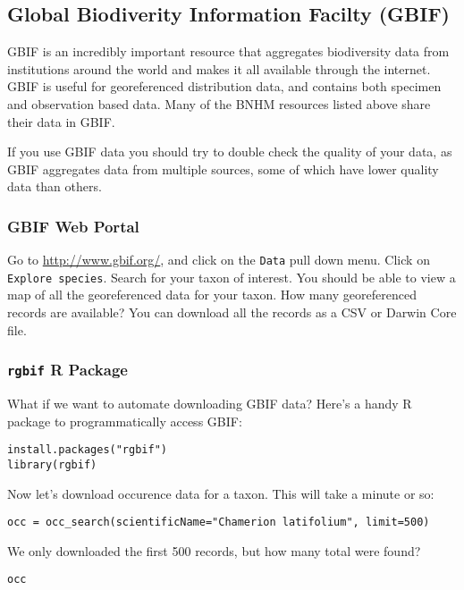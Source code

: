 \documentclass[11pt]{article}
\begin{document}
\subsection{Global Biodiverity Information Facilty (GBIF)}

GBIF is an incredibly important resource that aggregates
biodiversity data from institutions around the world
and makes it all available through the internet.
GBIF is useful for georeferenced distribution data,
and contains both specimen and observation based data.
Many of the BNHM resources listed above share their data
in GBIF.

If you use GBIF data you should try to double check the quality of your data,
as GBIF aggregates data from multiple sources, some of which have lower quality data
than others.

\subsubsection{GBIF Web Portal}

Go to \url{http://www.gbif.org/}, and click on the 
\texttt{Data} pull down menu. Click on \texttt{Explore species}.
Search for your taxon of interest.
You should be able to view a map of all the georeferenced data
for your taxon.
How many georeferenced records are available?
You can download all the records as a CSV or Darwin Core file.

\subsubsection{\texttt{rgbif} R Package}

What if we want to automate downloading GBIF data?
Here's a handy R package to programmatically access GBIF:

\begin{verbatim}
install.packages("rgbif")
library(rgbif)
\end{verbatim}

Now let's download occurence data for a taxon.
This will take a minute or so:

\begin{verbatim}
occ = occ_search(scientificName="Chamerion latifolium", limit=500)
\end{verbatim}

We only downloaded the first 500 records, but how many total were found?

\begin{verbatim}
occ
\end{verbatim}
\end{document}
